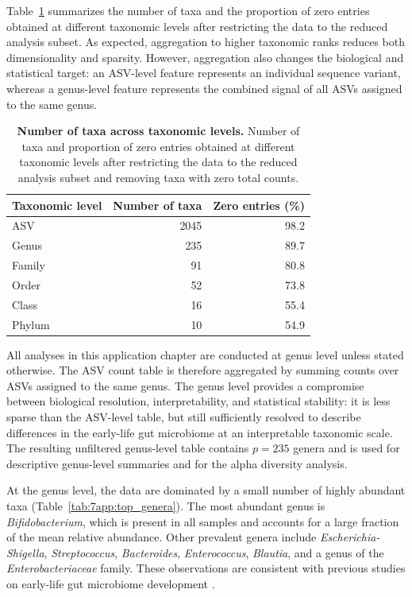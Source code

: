 Table~\ref{tab:7app:taxonomic_overview} summarizes the number of taxa and the proportion of zero entries obtained at different taxonomic levels after restricting the data to the reduced analysis subset. As expected, aggregation to higher taxonomic ranks reduces both dimensionality and sparsity. However, aggregation also changes the biological and statistical target: an ASV-level feature represents an individual sequence variant, whereas a genus-level feature represents the combined signal of all ASVs assigned to the same genus.

\begin{table}[!ht]
\centering
\caption{\textbf{Number of taxa across taxonomic levels.} Number of taxa and proportion of zero entries obtained at different taxonomic levels after restricting the data to the reduced analysis subset and removing taxa with zero total counts.}
\label{tab:7app:taxonomic_overview}
\vspace{0.5em}
\begin{tabular}{lrr}
\toprule
Taxonomic level & Number of taxa & Zero entries (\%) \\
\midrule
ASV & 2045 & 98.2 \\
Genus & 235 & 89.7 \\
Family & 91 & 80.8 \\
Order & 52 & 73.8 \\
Class & 16 & 55.4 \\
Phylum & 10 & 54.9 \\
\bottomrule
\end{tabular}
\end{table}

All analyses in this application chapter are conducted at genus level unless stated otherwise. The ASV count table is therefore aggregated by summing counts over ASVs assigned to the same genus. The genus level provides a compromise between biological resolution, interpretability, and statistical stability: it is less sparse than the ASV-level table, but still sufficiently resolved to describe differences in the early-life gut microbiome at an interpretable taxonomic scale. The resulting unfiltered genus-level table contains $p = 235$ genera and is used for descriptive genus-level summaries and for the alpha diversity analysis.

At the genus level, the data are dominated by a small number of highly abundant taxa (Table~\ref{tab:7app:top_genera}). The most abundant genus is \emph{Bifidobacterium}, which is present in all samples and accounts for a large fraction of the mean relative abundance. Other prevalent genera include \emph{Escherichia-Shigella}, \emph{Streptococcus}, \emph{Bacteroides}, \emph{Enterococcus}, \emph{Blautia}, and a genus of the \emph{Enterobacteriaceae} family. These observations are consistent with previous studies on early-life gut microbiome development \citep{favier2003development}.

